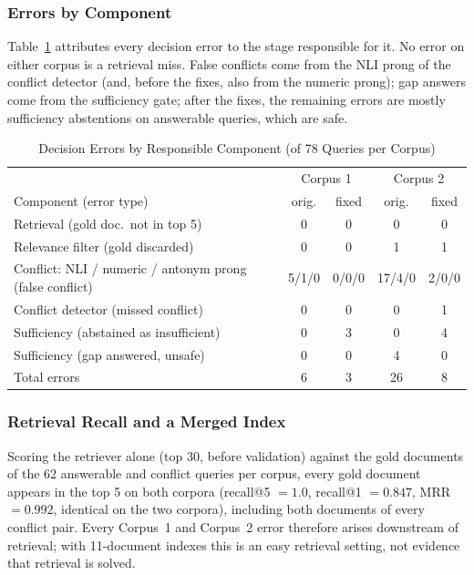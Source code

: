 \documentclass[conference]{IEEEtran}
\begin{document}
\subsubsection{Errors by Component}
\label{sec:errors_component}

Table~\ref{tab:errors_component} attributes every decision error to the
stage responsible for it. No error on either corpus is a retrieval miss.
False conflicts come from the NLI prong of the conflict detector (and,
before the fixes, also from the numeric prong); gap answers come from the
sufficiency gate; after the fixes, the remaining errors are mostly
sufficiency abstentions on answerable queries, which are safe.

\begin{table}[htbp]
\caption{Decision Errors by Responsible Component (of 78 Queries per Corpus)}
\label{tab:errors_component}
\centering
\scriptsize
\setlength{\tabcolsep}{3pt}
\begin{tabularx}{\columnwidth}{@{}X c c c c@{}}
\toprule
 & \multicolumn{2}{c}{Corpus 1} & \multicolumn{2}{c}{Corpus 2} \\
Component (error type) & orig. & fixed & orig. & fixed \\
\midrule
Retrieval (gold doc.\ not in top 5)        & 0 & 0 & 0 & 0 \\
Relevance filter (gold discarded)          & 0 & 0 & 1 & 1 \\
Conflict: NLI / numeric / antonym prong (false conflict) & 5/1/0 & 0/0/0 & 17/4/0 & 2/0/0 \\
Conflict detector (missed conflict)        & 0 & 0 & 0 & 1 \\
Sufficiency (abstained as insufficient)    & 0 & 3 & 0 & 4 \\
Sufficiency (gap answered, unsafe)         & 0 & 0 & 4 & 0 \\
\midrule
Total errors                               & 6 & 3 & 26 & 8 \\
\bottomrule
\end{tabularx}
\end{table}

\subsubsection{Retrieval Recall and a Merged Index}
\label{sec:retrieval_recall}

Scoring the retriever alone (top 30, before validation) against the gold
documents of the 62 answerable and conflict queries per corpus, every gold
document appears in the top 5 on both corpora (recall@5 $=1.0$,
recall@1 $=0.847$, MRR $=0.992$, identical on the two corpora), including
both documents of every conflict pair. Every Corpus~1 and Corpus~2 error
therefore arises downstream of retrieval; with 11-document indexes this is
an easy retrieval setting, not evidence that retrieval is solved.
\end{document}
